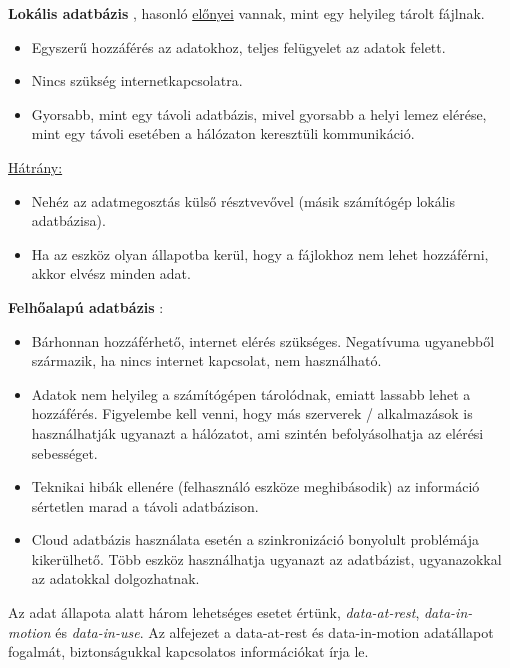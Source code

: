 \noindent \textbf{Lokális adatbázis} \cite{enwiki:1085248519}, hasonló \underline{előnyei} vannak, mint egy helyileg tárolt fájlnak.
\begin{itemize}
	\item Egyszerű hozzáférés az adatokhoz, teljes felügyelet az adatok felett.
	\item Nincs szükség internetkapcsolatra.
	\item Gyorsabb, mint egy távoli adatbázis, mivel gyorsabb a helyi lemez elérése, mint egy távoli esetében a hálózaton keresztüli kommunikáció.
\end{itemize}

\noindent \underline{Hátrány:}
\begin{itemize}
	\item Nehéz az adatmegosztás külső résztvevővel (másik számítógép lokális adatbázisa).
	\item Ha az eszköz olyan állapotba kerül, hogy a fájlokhoz nem lehet hozzáférni, akkor elvész minden adat.
\end{itemize}

\newpage \noindent \textbf{Felhőalapú adatbázis} \cite{chandra2012study}:
\begin{itemize}
	\item Bárhonnan hozzáférhető, internet elérés szükséges. Negatívuma ugyanebből származik, ha nincs internet kapcsolat, nem használható.
	\item Adatok nem helyileg a számítógépen tárolódnak, emiatt lassabb lehet a hozzáférés. Figyelembe kell venni, hogy más szerverek / alkalmazások is használhatják ugyanazt a hálózatot, ami szintén befolyásolhatja az elérési sebességet.
	\item Teknikai hibák ellenére (felhasználó eszköze meghibásodik) az információ sértetlen marad a távoli adatbázison.
	\item Cloud adatbázis használata esetén a szinkronizáció bonyolult problémája kikerülhető. Több eszköz használhatja ugyanazt az adatbázist, ugyanazokkal az adatokkal dolgozhatnak.
\end{itemize}


Az adat állapota alatt három lehetséges esetet értünk, \textit{data-at-rest}, \textit{data-in-motion} és \textit{data-in-use}. Az alfejezet a data-at-rest és data-in-motion \cite{varriale2016secube} adatállapot fogalmát, biztonságukkal kapcsolatos információkat írja le.


